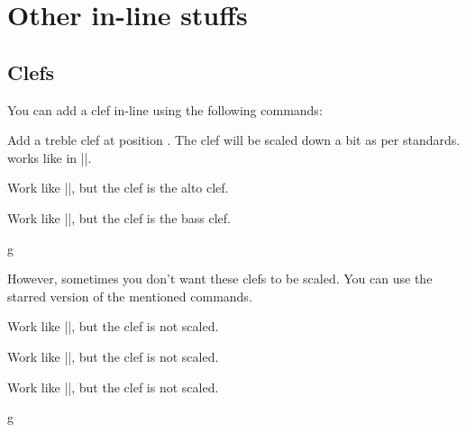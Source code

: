 \section{Other in-line stuffs}\label{sec:inline}
\subsection{Clefs}\label{sec:inline:clef}
You can add a clef in-line using the following commands:
\begin{command}{\tmgclef{}}
  Add a treble clef at position . The clef will be scaled down a bit 
  as per standards.  works like in |\tmkeysignature|.
\end{command}
\begin{command}{\tmcclef{}}
  Work like |\tmgclef|, but the clef is the alto clef.
\end{command}
\begin{command}{\tmfclef{}}
  Work like |\tmgclef|, but the clef is the bass clef.
\end{command}
\begin{codeexample}[]
\begin{tmline}
\begin{tmstaff}{g}{}
\end{tmstaff}
\end{tmline}
\end{codeexample}
However, sometimes you don't want these clefs to be scaled. You can use the 
starred version of the mentioned commands.
\begin{command}{\tmgclef*{}}
  Work like |\tmgclef|, but the clef is not scaled.
\end{command}
\begin{command}{\tmcclef*{}}
  Work like |\tmcclef|, but the clef is not scaled.
\end{command}
\begin{command}{\tmfclef*{}}
  Work like |\tmfclef|, but the clef is not scaled.
\end{command}
\begin{codeexample}[]
\begin{tmline}
\begin{tmstaff}{g}{}
\end{tmstaff}%
\end{tmline}
\end{codeexample}
